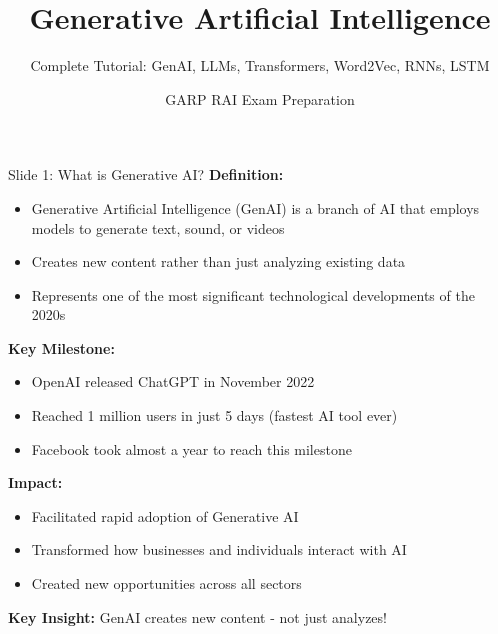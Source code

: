 \documentclass[8pt]{beamer}
\title{Generative Artificial Intelligence}
\subtitle{Complete Tutorial: GenAI, LLMs, Transformers, Word2Vec, RNNs, LSTM}
\author{GARP RAI Exam Preparation}
\date{}
\begin{document}
	
	\begin{frame}
		\titlepage
	\end{frame}
	
	
	\begin{frame}{Slide 1: What is Generative AI?}
		\fontsize{6.5}{7.5}\selectfont
		\textbf{Definition:}
		\begin{itemize}
			\item Generative Artificial Intelligence (GenAI) is a branch of AI that employs models to generate text, sound, or videos
			\item Creates new content rather than just analyzing existing data
			\item Represents one of the most significant technological developments of the 2020s
		\end{itemize}
		
		\vspace{0.1cm}
		\textbf{Key Milestone:}
		\begin{itemize}
			\item OpenAI released ChatGPT in November 2022
			\item Reached 1 million users in just 5 days (fastest AI tool ever)
			\item Facebook took almost a year to reach this milestone
		\end{itemize}
		
		\vspace{0.1cm}
		\textbf{Impact:}
		\begin{itemize}
			\item Facilitated rapid adoption of Generative AI
			\item Transformed how businesses and individuals interact with AI
			\item Created new opportunities across all sectors
		\end{itemize}
		
		\textcolor{myblue}{\textbf{Key Insight:}} GenAI creates new content - not just analyzes!
	\end{frame}
	
\end{document}
